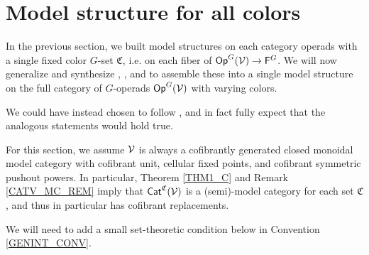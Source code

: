 \documentclass[a4paper,10pt
,draft
]{article}%
\renewcommand{\1}{\eta}%
\begin{document}
\section{Model structure for all colors}
\label{MS_SEC}
\renewcommand{\C}{\mathfrak C}


In the previous section, we built model structures on each category operads with a single fixed color $G$-set $\mathfrak C$,
i.e. on each fiber of $\mathsf{Op}^G(\mathcal V) \to \mathsf{F}^G$. 
We will now generalize and synthesize \cite{BM13}, \cite{Cav}, and \cite{CM13b} to assemble these
into a single model structure on the full category of $G$-operads $\mathsf{Op}^G(\mathcal V)$ with varying colors.




\begin{remark}
      We could have instead chosen to follow \cite{Mur15}, and in fact
      fully expect that the analogous statements would hold true.
\end{remark}

\begin{convention}
      \label{ALLCOLOR_CONV}
      For this section, we assume $\mathcal V$ is always a cofibrantly generated closed monoidal model category with
      cofibrant unit, cellular fixed points, and cofibrant symmetric pushout powers.
      In particular, Theorem \ref{THM1_C} and Remark \ref{CATV_MC_REM} imply that $\mathsf{Cat}^{\mathfrak C}(\mathcal V)$ is a (semi)-model category for each set $\mathfrak C$,
      and thus in particular has cofibrant replacements.

      We will need to add a small set-theoretic condition below in Convention \ref{GENINT_CONV}.
\end{convention}
\end{document}

